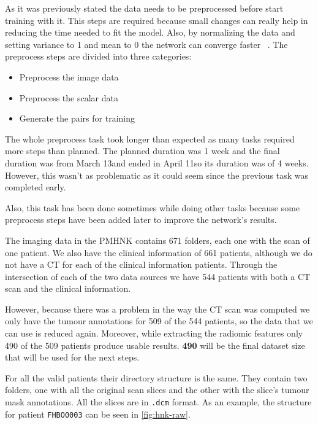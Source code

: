 



As it was previously stated the data needs to be preprocessed before start training with it.
This steps are required because small changes can really help in reducing the time needed to
fit the model. Also, by normalizing the data and setting variance to 1 and mean to 0 the network
can converge faster ~\cite{neural:efficient-backprop}. 
The preprocess steps are divided into three categories:
\begin{itemize}
  \item Preprocess the image data
  \item Preprocess the scalar data
  \item Generate the pairs for training
\end{itemize}

The whole preprocess task took longer than expected as many tasks required more steps than 
planned. The planned duration was 1 week and the final duration was from March 13\Th and
ended in April 11\Th so its duration was of 4 weeks. However, this wasn't as problematic as 
it could seem since the previous task was completed early.

Also, this task has been done sometimes while doing other tasks because some preprocess 
steps have been added later to improve the network's results.


The imaging data in the \Gls{PMHNK} contains 671 folders, each one with the scan of one patient. 
We also have the clinical information of 661 patients, although we do not have a \gls{CT} for
each of the clinical information patients. Through the intersection of each of the two data
sources we have 544 patients with both a \gls{CT} scan and the clinical information.

However, because there was a problem in the way the \gls{CT} scan was computed we only have
the tumour annotations for 509 of the 544 patients, so the data that we can use is reduced
again. Moreover, while extracting the radiomic features only 490 of the 509 patients produce 
usable results. \textbf{490} will be the final dataset size that will be used for the next 
steps.

For all the valid patients their directory structure is the same. They contain two folders,
one with all the original scan slices and the other with the slice's tumour mask annotations. 
All the slices are in \verb|.dcm| format.
As an example, the structure for patient \texttt{FHBO0003} can be seen in \autoref{fig:hnk-raw}.

